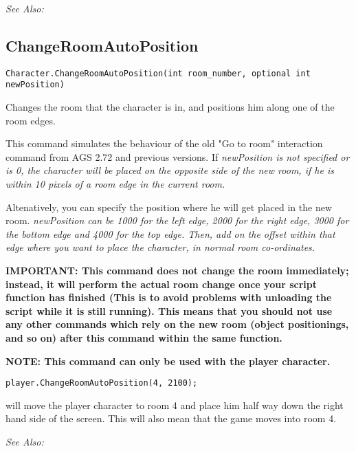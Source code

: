\it{See Also:} 



\subsection{ChangeRoomAutoPosition}\label{Character.ChangeRoomAutoPosition}%

\begin{verbatim}
Character.ChangeRoomAutoPosition(int room_number, optional int newPosition)
\end{verbatim}

Changes the room that the character is in, and positions him along one of the room edges.

This command simulates the behaviour of the old "Go to room" interaction command from AGS 2.72
and previous versions. If \it{newPosition} is not specified or is 0, the character will be
placed on the opposite side of the new room, if he is within 10 pixels of a room edge in the
current room.

Altenatively, you can specify the position where he will get placed in the new room.
\it{newPosition} can be 1000 for the left edge, 2000 for the right edge, 3000 for the
bottom edge and 4000 for the top edge. Then, add on the offset within that edge where
you want to place the character, in normal room co-ordinates.

\bf{IMPORTANT:} This command does not change the room immediately; instead, it
will perform the actual room change once your script function has finished
(This is to avoid problems with unloading the script while it is still
running). This means that you should not use any other commands which rely
on the new room (object positionings, and so on) after this command within
the same function.

\bf{NOTE:} This command can only be used with the player character.

\begin{verbatim}
player.ChangeRoomAutoPosition(4, 2100);
\end{verbatim}
will move the player character to room 4 and place him half way down the right hand side of the screen.
This will also mean that the game moves into room 4.

\it{See Also:} 



